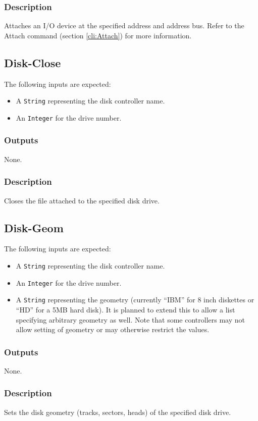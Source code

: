 \documentclass[10pt, openany]{book}
\newcommand{\datatype}[1]{\texttt{#1}}
\begin{document}
\subsubsection{Description}
Attaches an I/O device at the specified address and address bus.
Refer to the Attach command (section \ref{cli:Attach}) for more information.

\subsection{Disk-Close}
The following inputs are expected:
\begin{itemize}
  \item A \datatype{String} representing the disk controller name.
  \item An \datatype{Integer} for the drive number.
\end{itemize}
\subsubsection{Outputs}
None.
\subsubsection{Description}
Closes the file attached to the specified disk drive.

\subsection{Disk-Geom}
The following inputs are expected:
\begin{itemize}
  \item A \datatype{String} representing the disk controller name.
  \item An \datatype{Integer} for the drive number.
  \item A \datatype{String} representing the geometry (currently ``IBM'' for 8 inch diskettes or ``HD'' for a 5MB hard disk).  It is planned to extend this to allow a list specifying arbitrary geometry as well.  Note that some controllers may not allow setting of geometry or may otherwise restrict the values.
\end{itemize}
\subsubsection{Outputs}
None.
\subsubsection{Description}
Sets the disk geometry (tracks, sectors, heads) of the specified disk drive.
\end{document}
